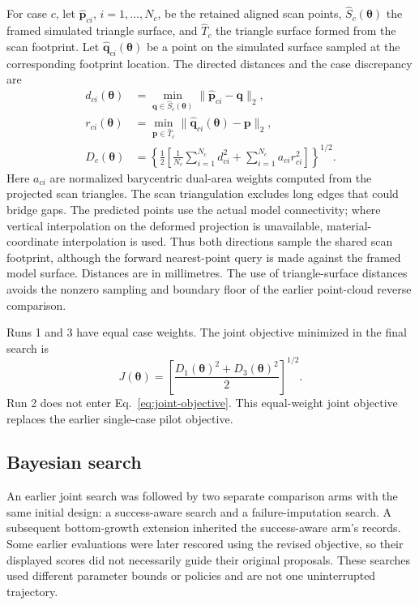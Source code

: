 \documentclass[11pt]{article}
\begin{document}
For case $c$, let $\widehat{\mathbf p}_{ci}$, $i=1,\ldots,N_c$, be the retained aligned scan points, $\widehat S_c(\boldsymbol\theta)$ the framed simulated triangle surface, and $\widehat T_c$ the triangle surface formed from the scan footprint. Let $\widehat{\mathbf q}_{ci}(\boldsymbol\theta)$ be a point on the simulated surface sampled at the corresponding footprint location. The directed distances and the case discrepancy are
\begin{align}
 d_{ci}(\boldsymbol\theta)&=\min_{\mathbf q\in\widehat S_c(\boldsymbol\theta)}
          \lVert\widehat{\mathbf p}_{ci}-\mathbf q\rVert_2,\\
 r_{ci}(\boldsymbol\theta)&=\min_{\mathbf p\in\widehat T_c}
          \lVert\widehat{\mathbf q}_{ci}(\boldsymbol\theta)-\mathbf p\rVert_2,\\
 D_c(\boldsymbol\theta)&=\left\{\frac12\left[
 \frac{1}{N_c}\sum_{i=1}^{N_c}d_{ci}^{2}
 +\sum_{i=1}^{N_c}a_{ci}r_{ci}^{2}\right]\right\}^{1/2}.
 \label{eq:case-objective}
\end{align}
Here $a_{ci}$ are normalized barycentric dual-area weights computed from the projected scan triangles. The scan triangulation excludes long edges that could bridge gaps. The predicted points use the actual model connectivity; where vertical interpolation on the deformed projection is unavailable, material-coordinate interpolation is used. Thus both directions sample the shared scan footprint, although the forward nearest-point query is made against the framed model surface. Distances are in millimetres. The use of triangle-surface distances avoids the nonzero sampling and boundary floor of the earlier point-cloud reverse comparison.

Runs 1 and 3 have equal case weights. The joint objective minimized in the final search is
\begin{equation}
 J(\boldsymbol\theta)=\left[\frac{D_1(\boldsymbol\theta)^2+D_3(\boldsymbol\theta)^2}{2}\right]^{1/2}.
 \label{eq:joint-objective}
\end{equation}
Run 2 does not enter Eq.~\eqref{eq:joint-objective}. This equal-weight joint objective replaces the earlier single-case pilot objective.

\subsection{Bayesian search}
An earlier joint search was followed by two separate comparison arms with the same initial design: a success-aware search and a failure-imputation search. A subsequent bottom-growth extension inherited the success-aware arm's records. Some earlier evaluations were later rescored using the revised objective, so their displayed scores did not necessarily guide their original proposals. These searches used different parameter bounds or policies and are not one uninterrupted trajectory.
\end{document}
